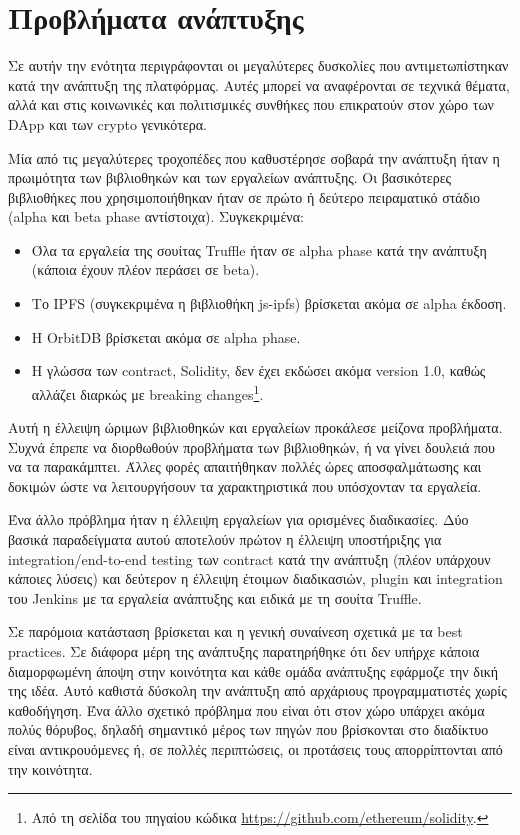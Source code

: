 \section{Προβλήματα ανάπτυξης} \label{section:4-4-problems-faced}

Σε αυτήν την ενότητα περιγράφονται οι μεγαλύτερες δυσκολίες που αντιμετωπίστηκαν κατά την ανάπτυξη της πλατφόρμας. Αυτές μπορεί να αναφέρονται σε τεχνικά θέματα, αλλά και στις κοινωνικές και πολιτισμικές συνθήκες που επικρατούν στον χώρο των DApp και των crypto γενικότερα.

Μία από τις μεγαλύτερες τροχοπέδες που καθυστέρησε σοβαρά την ανάπτυξη ήταν η πρωιμότητα των βιβλιοθηκών και των εργαλείων ανάπτυξης. Οι βασικότερες βιβλιοθήκες που χρησιμοποιήθηκαν ήταν σε πρώτο ή δεύτερο πειραματικό στάδιο (alpha και beta phase αντίστοιχα). Συγκεκριμένα:

\begin{itemize}
	\item Όλα τα εργαλεία της σουίτας Truffle ήταν σε alpha phase κατά την ανάπτυξη (κάποια έχουν πλέον περάσει σε beta).
	\item Το IPFS (συγκεκριμένα η βιβλιοθήκη js-ipfs) βρίσκεται ακόμα σε alpha έκδοση.
	\item Η OrbitDB βρίσκεται ακόμα σε alpha phase.
	\item Η γλώσσα των contract, Solidity, δεν έχει εκδώσει ακόμα version 1.0, καθώς αλλάζει διαρκώς με breaking changes\footnote{Από τη σελίδα του πηγαίου κώδικα \url{https://github.com/ethereum/solidity}.}.
\end{itemize}

Αυτή η έλλειψη ώριμων βιβλιοθηκών και εργαλείων προκάλεσε μείζονα προβλήματα. Συχνά έπρεπε να διορθωθούν προβλήματα των βιβλιοθηκών, ή να γίνει δουλειά που να τα παρακάμπτει. Άλλες φορές απαιτήθηκαν πολλές ώρες αποσφαλμάτωσης και δοκιμών ώστε να λειτουργήσουν τα χαρακτηριστικά που υπόσχονταν τα εργαλεία.

Ένα άλλο πρόβλημα ήταν η έλλειψη εργαλείων για ορισμένες διαδικασίες. Δύο βασικά παραδείγματα αυτού αποτελούν πρώτον η έλλειψη υποστήριξης για integration/end-to-end testing των contract κατά την ανάπτυξη (πλέον υπάρχουν κάποιες λύσεις) και δεύτερον η έλλειψη έτοιμων διαδικασιών, plugin και integration του Jenkins με τα εργαλεία ανάπτυξης και ειδικά με τη σουίτα Truffle.

Σε παρόμοια κατάσταση βρίσκεται και η γενική συναίνεση σχετικά με τα best practices. Σε διάφορα μέρη της ανάπτυξης παρατηρήθηκε ότι δεν υπήρχε κάποια διαμορφωμένη άποψη στην κοινότητα και κάθε ομάδα ανάπτυξης εφάρμοζε την δική της ιδέα. Αυτό καθιστά δύσκολη την ανάπτυξη από αρχάριους προγραμματιστές χωρίς καθοδήγηση. Ένα άλλο σχετικό πρόβλημα που είναι ότι στον χώρο υπάρχει ακόμα πολύς θόρυβος, δηλαδή σημαντικό μέρος των πηγών που βρίσκονται στο διαδίκτυο είναι αντικρουόμενες ή, σε πολλές περιπτώσεις, οι προτάσεις τους απορρίπτονται από την κοινότητα.

